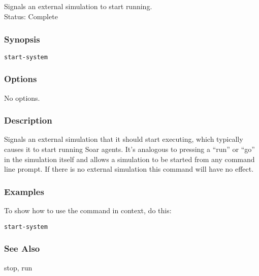 \subsection{}
\label{start-system}
Signals an external simulation to start running. \\ 
Status: Complete 
\subsubsection*{Synopsis}
\begin{verbatim}
start-system
\end{verbatim}
\subsubsection*{Options}
 No options. 
\subsubsection*{Description}
 Signals an external simulation that it should start executing, which typically causes it to start running Soar agents. It's analogous to pressing a ``run'' or ``go'' in the simulation itself and allows a simulation to be started from any command line prompt. If there is no external simulation this command will have no effect. 
\subsubsection*{Examples}
 To show how to use the command in context, do this: \begin{verbatim}
start-system
\end{verbatim}
\subsubsection*{See Also}
 stop, run

